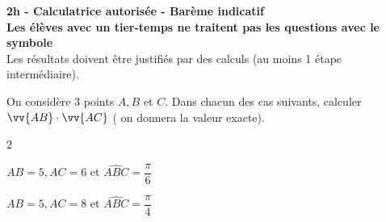 \documentclass[12pt,a4paper]{article}  %
\begin{document}
\graphicspath{{../images/}}

\begin{center}

\end{center}


\begin{center}\textbf{2h - Calculatrice autorisée - Barème indicatif}\\
\textbf{Les élèves avec un tier-temps ne traitent pas les questions avec  le symbole }\\
Les résultats doivent être justifiés par des calculs (au moins 1 étape intermédiaire).
\end{center}

%

\vspace{-.3cm} 
On considère 3 points $A, B$ et $C$. Dans chacun des cas suivants, calculer $\vv{A B} \cdot \vv{A C}$ ( on donnera la valeur exacte).
\begin{multicols}{2}
\begin{enumMet}
    \item $A B=5, A C=6$ et $\widehat{A B C}=\dfrac{\pi}{6}$
    \item {} $A B=5, A C=8$ et $\widehat{A B C}=\dfrac{\pi}{4}$
\end{enumMet}
\end{multicols}
\end{document}
